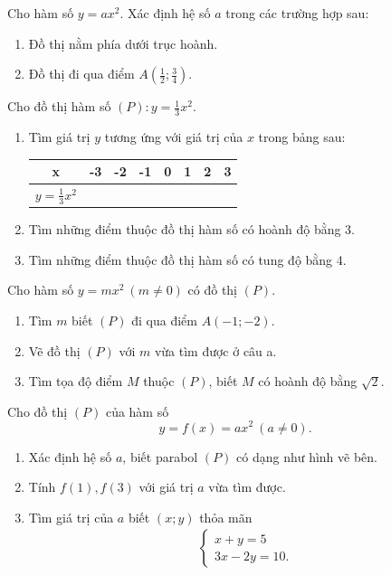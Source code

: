 \documentclass[%
    fontsize=12pt,%
    chapterprefix=false,%
    open=right,%
    twoside=false,%
    numbers=noenddot,%
    headings=optiontohead,%
    final,%
    DIV=15,%
    parskip=half %
]{scrbook}
\begin{document}
\begin{tuluan}

\item Cho hàm số $ y = ax^2 $. Xác định hệ số $ a $ trong các trường hợp sau:
\begin{enumerate}[label=\alph*)]
  \item[a)] Đồ thị nằm phía dưới trục hoành.
  \item[b)] Đồ thị đi qua điểm $ A\left(\frac{1}{2}; \frac{3}{4}\right) $.
\end{enumerate}

\item Cho đồ thị hàm số $ (P): y = \frac{1}{3}x^2 $.
\begin{enumerate}[label=\alph*)]
  \item[a)] Tìm giá trị $ y $ tương ứng với giá trị của $ x $ trong bảng sau: \begin{tabular}{|c|c|c|c|c|c|c|c|} \hline x & -3 & -2 & -1 & 0 & 1 & 2 & 3 \\ \hline $ y = \frac{1}{3}x^2 $ & & & & & & & \\ \hline \end{tabular}
  \item[b)] Tìm những điểm thuộc đồ thị hàm số có hoành độ bằng 3.
  \item[c)] Tìm những điểm thuộc đồ thị hàm số có tung độ bằng 4.
\end{enumerate}

\item Cho hàm số $ y = mx^2 \ (m \neq 0) $ có đồ thị $ (P) $.
\begin{enumerate}[label=\alph*)]
  \item[a)] Tìm $ m $ biết $ (P) $ đi qua điểm $ A(-1;-2) $.
  \item[b)] Vẽ đồ thị $ (P) $ với $ m $ vừa tìm được ở câu a.
  \item[c)] Tìm tọa độ điểm $ M $ thuộc $ (P) $, biết $ M $ có hoành độ bằng $ \sqrt{2} $.
\end{enumerate}

\item Cho đồ thị $ (P) $ của hàm số \[ y = f(x) = ax^2 \ (a \neq 0). \]
\begin{enumerate}[label=\alph*)]
  \item[a)] Xác định hệ số $ a $, biết parabol $ (P) $ có dạng như hình vẽ bên.
  \item[b)] Tính $ f(1), f(3) $ với giá trị $ a $ vừa tìm được.
  \item[c)] Tìm giá trị của $ a $ biết $ (x; y) $ thỏa mãn \begin{align*} \begin{cases} x + y = 5 \\ 3x - 2y = 10. \end{cases} \end{align*}
\end{enumerate}


\end{tuluan}
\end{document}
